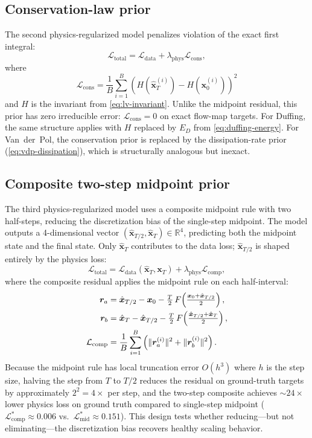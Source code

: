 \documentclass[11pt]{article}
\begin{document}
\subsection{Conservation-law prior}
\label{sec:conservation-prior}

The second physics-regularized model penalizes violation of the exact first integral:
\[
\mathcal{L}_{\mathrm{total}} = \mathcal{L}_{\mathrm{data}} + \lambda_{\mathrm{phys}} \mathcal{L}_{\mathrm{cons}},
\]
where
\[
\mathcal{L}_{\mathrm{cons}} = \frac{1}{B}\sum_{i=1}^{B} \left( H(\hat{\bm{x}}_T^{(i)}) - H(\bm{x}_0^{(i)}) \right)^2
\]
and $H$ is the invariant from \cref{eq:lv-invariant}.
Unlike the midpoint residual, this prior has zero irreducible error: $\mathcal{L}_{\mathrm{cons}} = 0$ on exact flow-map targets.
For Duffing, the same structure applies with $H$ replaced by $E_D$ from \cref{eq:duffing-energy}.
For Van~der~Pol, the conservation prior is replaced by the dissipation-rate prior (\cref{eq:vdp-dissipation}), which is structurally analogous but inexact.

\subsection{Composite two-step midpoint prior}
\label{sec:composite-prior}

The third physics-regularized model uses a composite midpoint rule with two half-steps, reducing the discretization bias of the single-step midpoint.
The model outputs a 4-dimensional vector $(\hat{\bm{x}}_{T/2}, \hat{\bm{x}}_T) \in \mathbb{R}^4$, predicting both the midpoint state and the final state.
Only $\hat{\bm{x}}_T$ contributes to the data loss; $\hat{\bm{x}}_{T/2}$ is shaped entirely by the physics loss:
\[
\mathcal{L}_{\mathrm{total}} = \mathcal{L}_{\mathrm{data}}(\hat{\bm{x}}_T, \bm{x}_T) + \lambda_{\mathrm{phys}} \mathcal{L}_{\mathrm{comp}},
\]
where the composite residual applies the midpoint rule on each half-interval:
\begin{align}
\bm{r}_a &= \hat{\bm{x}}_{T/2} - \bm{x}_0 - \tfrac{T}{2}\, F\!\left(\tfrac{\bm{x}_0 + \hat{\bm{x}}_{T/2}}{2}\right), \label{eq:comp-ra} \\
\bm{r}_b &= \hat{\bm{x}}_T - \hat{\bm{x}}_{T/2} - \tfrac{T}{2}\, F\!\left(\tfrac{\hat{\bm{x}}_{T/2} + \hat{\bm{x}}_T}{2}\right), \label{eq:comp-rb} \\
\mathcal{L}_{\mathrm{comp}} &= \frac{1}{B}\sum_{i=1}^{B} \left(\|\bm{r}_a^{(i)}\|^2 + \|\bm{r}_b^{(i)}\|^2\right). \notag
\end{align}
Because the midpoint rule has local truncation error $O(h^3)$ where $h$ is the step size, halving the step from $T$ to $T/2$ reduces the residual on ground-truth targets by approximately $2^2 = 4\times$ per step, and the two-step composite achieves $\sim\!24\times$ lower physics loss on ground truth compared to single-step midpoint ($\mathcal{L}_{\mathrm{comp}}^* \approx 0.006$ vs.\ $\mathcal{L}_{\mathrm{mid}}^* \approx 0.151$).
This design tests whether reducing---but not eliminating---the discretization bias recovers healthy scaling behavior.
\end{document}
